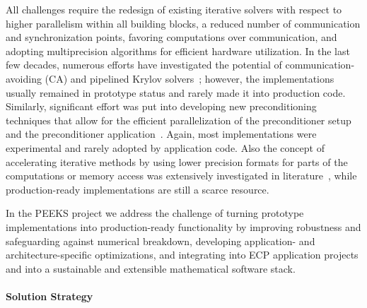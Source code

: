 All challenges require the redesign of existing iterative solvers with respect 
to higher parallelism within all building blocks, a reduced number of 
communication and synchronization points, favoring computations over 
communication, and adopting multiprecision algorithms for efficient hardware 
utilization. 
In the last few decades, numerous efforts 
have investigated the potential of communication-avoiding (CA) and pipelined 
Krylov solvers~\cite{yamazakiipdps2014,Cornelis2018TheCC}; however, the 
implementations usually 
remained in prototype status and rarely made it into production code. 
Similarly, significant effort was put into developing new preconditioning 
techniques that allow for the efficient parallelization of the preconditioner 
setup and the preconditioner 
application~\cite{chowisc2015,anzteuropa2015,ANZT20181}. 
Again, most implementations were experimental and rarely adopted by application 
code.
Also the concept of accelerating iterative methods by using lower precision 
formats for parts of the computations or memory access was extensively 
investigated in literature~\cite{carson1,carson2,doi:10.1002/cpe.4460}, 
while production-ready implementations are still a scarce resource. 

In the PEEKS project we address the challenge of turning prototype 
implementations into production-ready functionality by improving robustness and 
safeguarding against numerical breakdown, developing application- and 
architecture-specific optimizations, and integrating into ECP application 
projects and into a sustainable and extensible mathematical software stack.

\paragraph{Solution Strategy}

